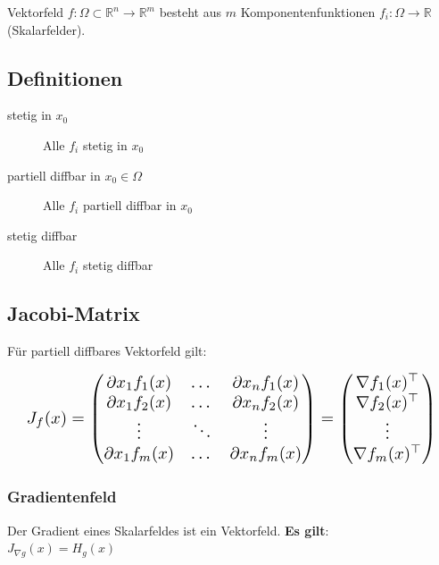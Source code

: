 Vektorfeld $f: \Omega \subset \mathbb R^n \rightarrow \mathbb R^m$ besteht aus $m$ Komponentenfunktionen $f_i : \Omega \rightarrow \mathbb R$ (Skalarfelder).

\subsection{Definitionen}
\begin{description}
    \item[stetig in $x_0$] Alle $f_i$ stetig in $x_0$
    \item[partiell diffbar in $x_0 \in \Omega$] Alle $f_i$ partiell diffbar in $x_0$
    \item[stetig diffbar] Alle $f_i$ stetig diffbar
\end{description}

\subsection{Jacobi-Matrix}
Für partiell diffbares Vektorfeld gilt:

\begin{equation*}
    \resizebox{.98\hsize}{!}{
        $J_f(x)=\begin{pmatrix}
            \partial x_1 f_1(x) & \dots  & \partial x_nf_1(x) \\
            \partial x_1 f_2(x) & \dots  & \partial x_nf_2(x) \\
            \vdots              & \ddots & \vdots             \\
            \partial x_1 f_m(x) & \dots  & \partial x_nf_m(x) \\
        \end{pmatrix} = \begin{pmatrix}
            \nabla f_1(x)^\top \\
            \nabla f_2(x)^\top \\
            \vdots             \\
            \nabla f_m(x)^\top
        \end{pmatrix}$
    }
\end{equation*}

\subsubsection{Gradientenfeld}
Der Gradient eines Skalarfeldes ist ein Vektorfeld. \textbf{Es gilt}: \\
\hspace*{.1\textwidth}$J_{\nabla g}(x)=H_g(x)$

